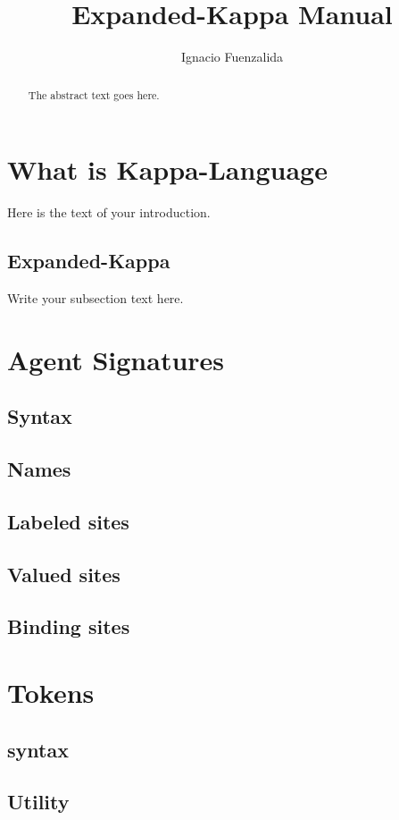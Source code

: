 \documentclass{article}
\begin{document}
\title{Expanded-Kappa Manual}
\author{Ignacio Fuenzalida}

\maketitle

\begin{abstract}
The abstract text goes here.
\end{abstract}

\section{What is Kappa-Language}
Here is the text of your introduction.


\subsection{Expanded-Kappa}
Write your subsection text here.

\section{Agent Signatures}
\subsection{Syntax}
\subsection{Names}
\subsection{Labeled sites}
\subsection{Valued sites}
\subsection{Binding sites}


\section{Tokens}
\subsection{syntax}
\subsection{Utility}
\end{document}
